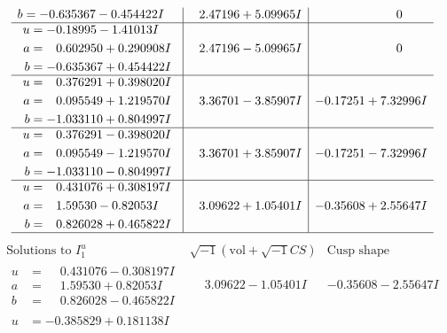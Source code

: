 \documentclass[1p]{elsarticle_modified}
\theoremstyle{definition}
\newcommand{\I}{\sqrt{-1}}
\begin{document}
$$\begin{array}{c|c|c}
\begin{aligned}
b &= -0.635367 - 0.454422 I\end{aligned}
 & \phantom{-}2.47196 + 5.09965 I & \phantom{-0.000000 } 0 \\ \hline\begin{aligned}
u &= -0.18995 - 1.41013 I \\
a &= \phantom{-}0.602950 + 0.290908 I \\
b &= -0.635367 + 0.454422 I\end{aligned}
 & \phantom{-}2.47196 - 5.09965 I & \phantom{-0.000000 } 0 \\ \hline\begin{aligned}
u &= \phantom{-}0.376291 + 0.398020 I \\
a &= \phantom{-}0.095549 + 1.219570 I \\
b &= -1.033110 + 0.804997 I\end{aligned}
 & \phantom{-}3.36701 - 3.85907 I & -0.17251 + 7.32996 I \\ \hline\begin{aligned}
u &= \phantom{-}0.376291 - 0.398020 I \\
a &= \phantom{-}0.095549 - 1.219570 I \\
b &= -1.033110 - 0.804997 I\end{aligned}
 & \phantom{-}3.36701 + 3.85907 I & -0.17251 - 7.32996 I \\ \hline\begin{aligned}
u &= \phantom{-}0.431076 + 0.308197 I \\
a &= \phantom{-}1.59530 - 0.82053 I \\
b &= \phantom{-}0.826028 + 0.465822 I\end{aligned}
 & \phantom{-}3.09622 + 1.05401 I & -0.35608 + 2.55647 I\\
 \hline 
 \end{array}$$\newpage$$\begin{array}{c|c|c}  
\text{Solutions to }I^u_{1}& \I (\text{vol} + \sqrt{-1}CS) & \text{Cusp shape}\\
 \hline 
\begin{aligned}
u &= \phantom{-}0.431076 - 0.308197 I \\
a &= \phantom{-}1.59530 + 0.82053 I \\
b &= \phantom{-}0.826028 - 0.465822 I\end{aligned}
 & \phantom{-}3.09622 - 1.05401 I & -0.35608 - 2.55647 I \\ \hline\begin{aligned}
u &= -0.385829 + 0.181138 I \\

\end{aligned}
\end{array}$$
\end{document}
